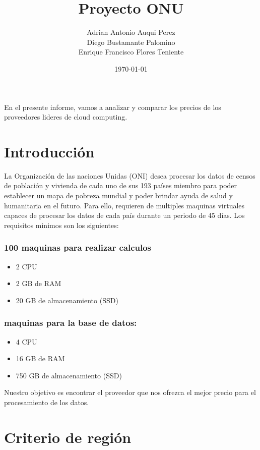 \documentclass{article}
\title{Proyecto ONU}
\date{\today}
\author{
    Adrian Antonio Auqui Perez \\
    Diego Bustamante Palomino \\
    Enrique Francisco Flores Teniente
  }
\affil{UTEC}
\begin{document}
\maketitle

En el presente informe, vamos a analizar y comparar los precios de los proveedores lideres de cloud computing.

\tableofcontents
\newpage

\section{Introducción}

La Organización de las naciones Unidas (ONI) desea
procesar los datos de censos de población y vivienda de
cada uno de sus 193 países miembro para poder establecer
un mapa de pobreza mundial y poder brindar ayuda de
salud y humanitaria en el futuro. Para ello, requieren de multiples maquinas virtuales capaces de procesar los datos de cada país durante un periodo de 45 días.
Los requisitos minimos son los siguientes:

\subsubsection*{100 maquinas para realizar calculos}
  \begin{itemize}
    \item 2 CPU
    \item 2 GB de RAM
    \item 20 GB de almacenamiento (SSD)
  \end{itemize}

\subsubsection*{maquinas para la base de datos:}
  \begin{itemize}
    \item 4 CPU
    \item 16 GB de RAM
    \item 750 GB de almacenamiento (SSD)
  \end{itemize}

Nuestro objetivo es encontrar el proveedor que nos ofrezca el mejor precio para el procesamiento de los datos.

\section{Criterio de región}
\end{document}

